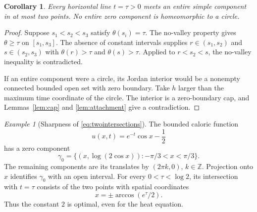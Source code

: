 \documentclass[11pt,reqno]{amsart}
\numberwithin{equation}{section}
\newtheorem{corollary}[theorem]{Corollary}
\theoremstyle{definition}
\theoremstyle{remark}
\newtheorem{example}[theorem]{Example}
\begin{document}
\begin{corollary}\label{cor:two}
Every horizontal line $t=\tau>0$ meets an entire simple component in at most two points. No entire zero component is homeomorphic to a circle.
\end{corollary}
\begin{proof}
Suppose $s_1<s_2<s_3$ satisfy $\theta(s_i)=\tau$. The no-valley property gives $\theta\geq\tau$ on $[s_1,s_3]$. The absence of constant intervals supplies $r\in(s_1,s_2)$ and $s\in(s_2,s_3)$ with $\theta(r)>\tau$ and $\theta(s)>\tau$. Applied to $r<s_2<s$, the no-valley inequality is contradicted.

If an entire component were a circle, its Jordan interior would be a nonempty connected bounded open set with zero boundary. Take $h$ larger than the maximum time coordinate of the circle. The interior is a zero-boundary cap, and Lemmas~\ref{lem:cap} and \ref{lem:attachment} give a contradiction.
\end{proof}

\begin{example}[Sharpness of \eqref{eq:twointersections}]\label{ex:two}
The bounded caloric function
\[
 u(x,t)=e^{-t}\cos x-\frac12
\]
has a zero component
\[
 \gamma_0=\{(x,\log(2\cos x)):-\pi/3<x<\pi/3\}.
\]
The remaining components are its translates by $(2\pi k,0)$, $k\in\mathbb Z$. Projection onto $x$ identifies $\gamma_0$ with an open interval. For every $0<\tau<\log2$, its intersection with $t=\tau$ consists of the two points with spatial coordinates
\[
 x=\pm\arccos(e^\tau/2).
\]
Thus the constant $2$ is optimal, even for the heat equation.
\end{example}
\end{document}
